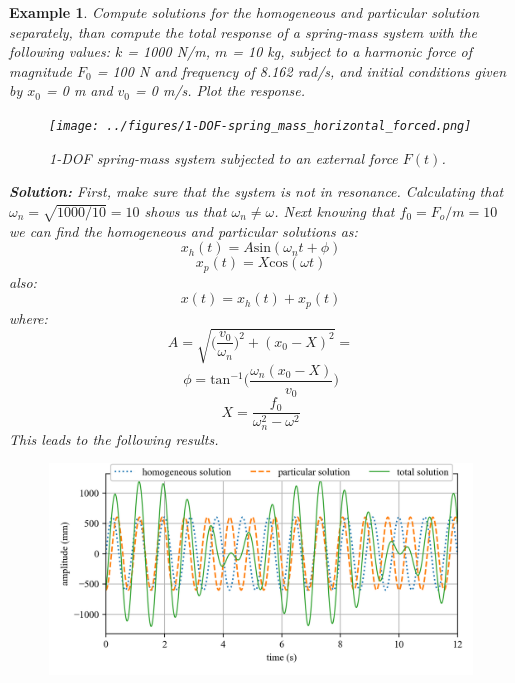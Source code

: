 \documentclass[12pt,letter]{article}
\newtheorem{ex}{Example}
\numberwithin{ex}{section} %
\newenvironment{example}{\begin{mdframed}[middlelinewidth=0.5mm]\begin{ex}\normalfont}{\end{ex}\end{mdframed}}
\numberwithin{re}{section} %
\begin{document}
\begin{example}

			Compute solutions for the homogeneous and particular solution separately, than compute the total response of a spring-mass system with the following values: $k$ = 1000 N/m, $m$ = 10 kg, subject to a harmonic force of magnitude $F_0$ = 100 N and frequency of 8.162 rad/s, and initial conditions given by $x_0$ = 0 m and $v_0$ = 0 m/s. Plot the response.
			
			\begin{figure}[H]
				\centering
				\texttt{[image: ../figures/1-DOF-spring\_mass\_horizontal\_forced.png]}
				\caption{1-DOF spring-mass system subjected to an external force $F(t)$.}
			\end{figure}
			
			\noindent\textbf{Solution:} First, make sure that the system is not in resonance. Calculating that $\omega_n = \sqrt{1000/10} = 10$ shows us that $\omega_n \neq \omega$. Next knowing that $f_0 = F_o/m = 10$ we can find the homogeneous and particular solutions as:
			\begin{equation}
				x_h(t) = A\text{sin}(\omega_n t + \phi)
			\end{equation}				
			\begin{equation}
				x_p(t) = X\text{cos}(\omega t) 
			\end{equation}	
			also:			
			\begin{equation}
				x(t) = x_h(t) + x_p(t)
			\end{equation}	
			where:			
			\begin{equation}
				A = \sqrt{\bigg(\frac{v_0}{\omega_n}\bigg)^2+(x_0-X)^2} = 
			\end{equation}				
			\begin{equation}
				\phi = \text{tan}^{-1}\bigg(\frac{\omega_n(x_0-X)}{v_0}\bigg)
			\end{equation}				
			\begin{equation}
				X = \frac{f_0}{\omega_n^2-\omega^2}
			\end{equation}			
			This leads to the following results. 
			\begin{figure}[H]
				\centering
				\includegraphics[]{../figures/homogeneous_and_particular_solutions.png}
			\end{figure}			

\end{example}
\end{document}

